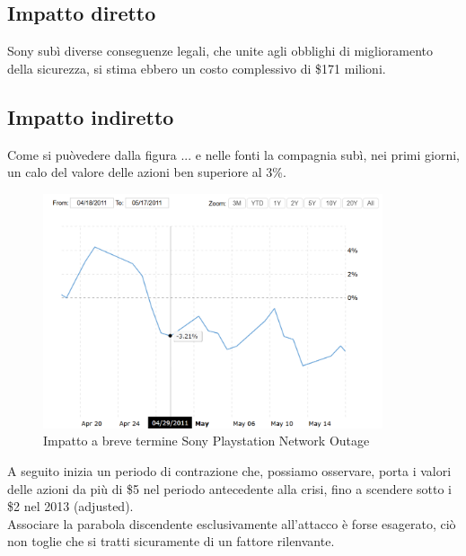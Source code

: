 \documentclass[12pt,a4paper,openright,twoside]{report}
\begin{document}
\subsection{Impatto diretto}
Sony sub\`i diverse conseguenze legali, che unite agli obblighi di miglioramento della sicurezza, si stima ebbero un costo complessivo di \$171 milioni.\\
\subsection{Impatto indiretto}
Come si pu\`ovedere dalla figura ... e nelle fonti \cite{Sony_pnt} la compagnia sub\`i, nei primi giorni, un calo del valore delle azioni ben superiore al 3\%.\\

\begin{figure}[H] 
\begin{center} 
\includegraphics[width=10cm]{figures/sony_2011_shortTerm.png} 
\caption[Grafico Sony PSN short]{Impatto a breve termine Sony Playstation Network Outage}\label{fig:pnt1}
\end{center}
\end{figure}

A seguito inizia un periodo di contrazione che, possiamo osservare, porta i valori delle azioni da pi\`u di \$5 nel periodo antecedente alla crisi, fino a scendere sotto i \$2 nel 2013 (adjusted). \\Associare la parabola discendente esclusivamente all'attacco \`e forse esagerato, ci\`o non toglie che si tratti sicuramente di un fattore rilenvante.\\ 
\end{document}
